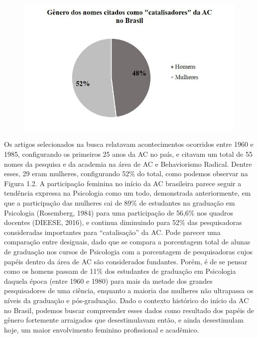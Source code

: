 \begin{figure}
\includegraphics[width=1\textwidth]{1/figura2}
\end{figure}

Os artigos selecionados na busca relatavam acontecimentos ocorridos entre 1960 e 1985, configurando os primeiros 25 anos da AC no país, e citavam um total de 55 nomes da pesquisa e da academia na área de AC e Behaviorismo Radical. Dentre esses, 29 eram mulheres, configurando 52\% do total, como podemos observar na Figura 1.2. A participação feminina no início da AC brasileira parece seguir a tendência expressa na Psicologia como um todo, demonstrada anteriormente, em que a participação das mulheres cai de 89\% de estudantes na graduação em Psicologia (Rosemberg, 1984) para uma participação de 56,6\% nos quadros docentes (DIEESE, 2016), e continua diminuindo para 52\% das pesquisadoras consideradas importantes para “catalisação” da AC. Pode parecer uma comparação entre desiguais, dado que se compara a porcentagem total de alunas de graduação nos cursos de Psicologia com a porcentagem de pesquisadoras cujos papéis dentro da área de AC são considerados fundantes. Porém, é de se pensar como os homens passam de 11\% dos estudantes de graduação em Psicologia daquela época (entre 1960 e 1980) para mais da metade dos grandes pesquisadores de uma ciência, enquanto a maioria das mulheres não ultrapassa os níveis da graduação e pós-graduação. Dado o contexto histórico do início da AC no Brasil, podemos buscar compreender esses dados como resultado dos papéis de gênero fortemente arraigados que desestimulavam então, e ainda desestimulam hoje, um maior envolvimento feminino profissional e acadêmico.

